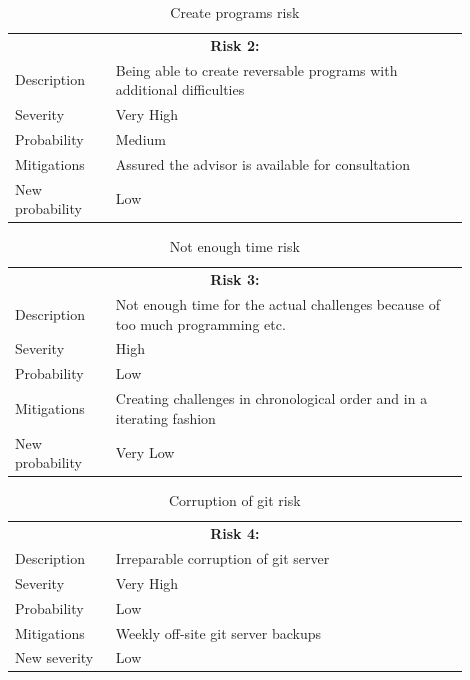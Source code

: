 \begin{table}
  \centering
  \begin{tabular}{|p{0.2\linewidth}p{0.7\linewidth}|}
    \hline
    \multicolumn{2}{|c|}{\textbf{Risk 2:}} \\
    Description     & Being able to create reversable programs with additional difficulties           \\
    Severity        & Very High                                 \\
    Probability     & Medium                                   \\
    Mitigations     & Assured the advisor is available for consultation  \\
    New probability & Low       \\
    \hline                            
  \end{tabular}
  \caption{Create programs risk}
\end{table}

\begin{table}
  \centering
  \begin{tabular}{|p{0.2\linewidth}p{0.7\linewidth}|}
    \hline
    \multicolumn{2}{|c|}{\textbf{Risk 3:}} \\
    Description            & Not enough time for the actual challenges because of too much programming etc.           \\
    Severity        & High                                 \\
    Probability     & Low                                   \\
    Mitigations     & Creating challenges in chronological order and in a iterating fashion  \\
    New probability & Very Low     \\
    \hline                              
  \end{tabular}
  \caption{Not enough time risk}
\end{table}

\begin{table}
  \centering
  \begin{tabular}{|p{0.2\linewidth}p{0.7\linewidth}|}
    \hline
    \multicolumn{2}{|c|}{\textbf{Risk 4:}} \\
    Description     & Irreparable corruption of git server           \\
    Severity        & Very High                                 \\
    Probability     & Low                                   \\
    Mitigations     & Weekly off-site git server backups  \\
    New severity    & Low      \\
    \hline                             
  \end{tabular}
  \caption{Corruption of git risk}
\end{table}

